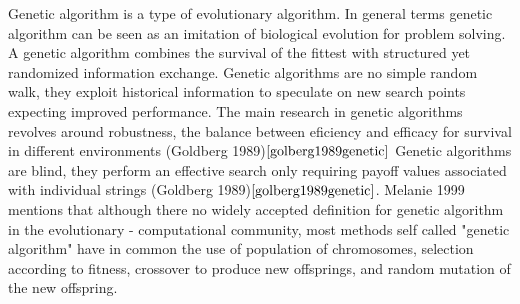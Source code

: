 \documentclass{article}
\begin{document}
Genetic algorithm is a type of evolutionary algorithm. In general terms genetic algorithm can be seen as an imitation of biological evolution for problem solving. A genetic algorithm combines the survival of the fittest with  structured yet randomized information exchange. Genetic algorithms are no simple random walk, they exploit historical information to speculate on new search points expecting improved performance. The main research in genetic algorithms revolves around robustness, the balance between eficiency and efficacy for survival in different environments (Goldberg 1989)$\cite{golberg1989genetic}$ Genetic algorithms are blind, they perform an effective search only requiring payoff values associated with individual strings (Goldberg 1989)$\cite{golberg1989genetic}$.  Melanie 1999 mentions that although there no widely accepted definition for genetic algorithm in the evolutionary - computational community, most methods self called "genetic algorithm" have in common the use of population of chromosomes, selection according to fitness, crossover to produce new offsprings, and random mutation of the new offspring.  
\end{document}
